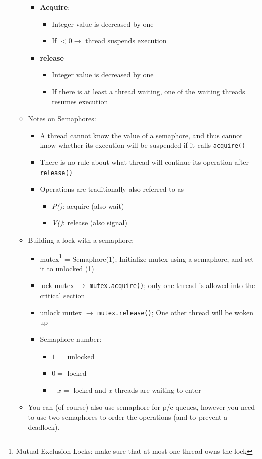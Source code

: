 \documentclass[a4paper]{article}
\newcommand{\inline}[1]{\lstinline!#1!}%
\begin{document}
\begin{itemize}
\begin{itemize}
\begin{itemize}
\begin{itemize}
\end{itemize}
\item \textbf{Acquire}:
\begin{itemize}
\item Integer value is decreased by one
\item If $<0\to$ thread suspends execution
\end{itemize}
\item \textbf{release}
\begin{itemize}
\item Integer value is decreased by one
\item If there is at least a thread waiting, one of the waiting threads resumes execution
\end{itemize}
\end{itemize}
\item Notes on Semaphores:
\begin{itemize}
\item A thread cannot know the value of a semaphore, and thus cannot know whether its execution will be suspended if it calls \inline{acquire()}
\item There is no rule about what thread will continue its operation after \inline{release()}
\item Operations are traditionally also referred to as
\begin{itemize}
\item \textsl{P()}: acquire (also wait)
\item \textsl{V()}: release (also signal)
\end{itemize}
\end{itemize}
\item Building a lock with a semaphore:
\begin{itemize}
\item mutex\footnote{Mutual Exclusion Locks: make sure that at most one thread owns the lock} = Semaphore(1); Initialize mutex using a semaphore, and set it to unlocked (1)
\item lock mutex $\to$ \inline{mutex.acquire()}; only one thread is allowed into the critical section
\item unlock mutex $\to$ \inline{mutex.release()}; One other thread will be woken up
\item Semaphore number:
\begin{itemize}
\item $1=$ unlocked
\item $0=$ locked
\item $-x=$ locked and $x$ threads are waiting to enter
\end{itemize}
\end{itemize}
\item You can (of course) also use semaphore for p/c queues, however you need to use two semaphores to order the operations (and to prevent a deadlock).
\end{itemize}


\end{itemize}
\end{document}
